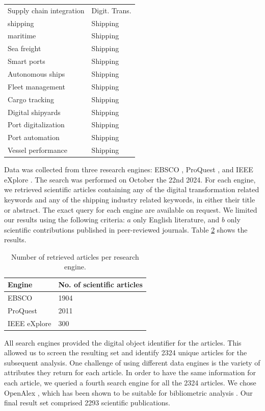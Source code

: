 \documentclass[a4paper, review, endfloat, authoryear]{elsarticle}
\begin{document}
\begin{table}[h]
\begin{tabularx}{\linewidth}{XX}
			Supply chain integration & Digit. Trans. \\
			shipping & Shipping \\
			maritime & Shipping \\
			Sea freight & Shipping \\
			Smart ports & Shipping \\
			Autonomous ships & Shipping \\
			Fleet management & Shipping \\
			Cargo tracking & Shipping \\
			Digital shipyards & Shipping \\
			Port digitalization & Shipping \\
			Port automation & Shipping \\
			Vessel performance & Shipping \\
			\hline
		\end{tabularx}
		\label{tab:keywords}
	\end{table}
	
	Data was collected from three research engines: EBSCO \citep{vaughan2011ebsco}, ProQuest \citep{cooke2017proquest}, and IEEE eXplore \citep{wilde2016ieee}. The search was performed on October the 22nd 2024. For each engine, we retrieved scientific articles containing any of the digital transformation related keywords and any of the shipping industry related keywords, in either their title or abstract. The exact query for each engine are available on request. We limited our results using the following criteria: \(a\) only English literature, and \(b\) only scientific contributions published in peer-reviewed journals. Table \ref{tab:searchres} shows the results.
	
	\begin{table}[h]
		\centering
		\caption{Number of retrieved articles per research engine.}
		\begin{tabularx}{\linewidth}{XX}
			\hline
			Engine & No. of scientific articles \\
			\hline
			EBSCO & 1904 \\
			ProQuest & 2011 \\
			IEEE eXplore & 300 \\
			\hline
		\end{tabularx}
		\label{tab:searchres}
	\end{table}
	
	All search engines provided the digital object identifier for the articles. This allowed us to screen the resulting set and identify 2324 unique articles for the subsequent analysis. One challenge of using different data engines is the variety of attributes they return for each article. In order to have the same information for each article, we queried a fourth search engine for all the 2324 articles. We chose OpenAlex \citep{priem2022openalex}, which has been shown to be suitable for bibliometric analysis \citep{alperin2024analysis}. Our final result set comprised 2293 scientific publications.
	
\end{document}
